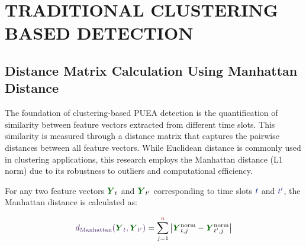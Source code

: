 

\chapter{\texorpdfstring{\color{chaptercolor}\scshape TRADITIONAL CLUSTERING BASED DETECTION}{TRADITIONAL CLUSTERING BASED DETECTION}}
\thispagestyle{fancy}
\begin{center}
\end{center}
\vspace{1cm}

\section{\texorpdfstring{\large\textbf{Distance Matrix Calculation Using Manhattan Distance}}{Distance Matrix Calculation Using Manhattan Distance}}

The foundation of clustering-based PUEA detection is the quantification of similarity between feature vectors extracted from different time slots. This similarity is measured through a distance matrix that captures the pairwise distances between all feature vectors. While Euclidean distance is commonly used in clustering applications, this research employs the Manhattan distance (L1 norm) due to its robustness to outliers and computational efficiency.

For any two feature vectors $\vector{Y}_t$ and $\vector{Y}_{t'}$ corresponding to time slots $\variable{t}$ and $\variable{t'}$, the Manhattan distance is calculated as:

\begin{tcolorbox}[enhanced, colback=blue!5, colframe=blue!75!black, 
arc=0pt, outer arc=0pt, boxrule=1pt, left=5pt, right=5pt, top=6pt, bottom=6pt]
\begin{equation}
    \formula{d_{\text{Manhattan}}(\vector{Y}_t, \vector{Y}_{t'})} = \sum_{j=1}^{\parameter{n}} \left|\vector{Y}_{t,j}^{\text{norm}} - \vector{Y}_{t',j}^{\text{norm}}\right|
\end{equation}
\end{tcolorbox}

